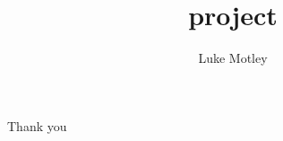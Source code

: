 \documentclass[11pt,notes=hide,aspectratio=169,mathserif]{beamer}
\title[project]{project}
\author[motley]{Luke Motley}
\date{\monthname[\the\month] \the\year}
\begin{document}
\begin{frame}[plain]
\titlepage
\note{
	\begin{itemize}
	\end{itemize}
}
\end{frame}
%

\begin{frame}[plain]
\begin{center}{\LARGE Thank you}\end{center}
\end{frame}


\appendix
%

%
\end{document}

